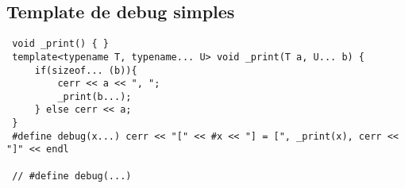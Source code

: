 \documentclass[11pt, a4paper, twoside]{article}
\begin{document}
\subsection{Template de debug simples}
\begin{lstlisting}
 void _print() { }
 template<typename T, typename... U> void _print(T a, U... b) {
     if(sizeof... (b)){
         cerr << a << ", ";
         _print(b...);
     } else cerr << a;
 }
 #define debug(x...) cerr << "[" << #x << "] = [", _print(x), cerr << "]" << endl
 
 // #define debug(...)
\end{lstlisting}
\end{document}
